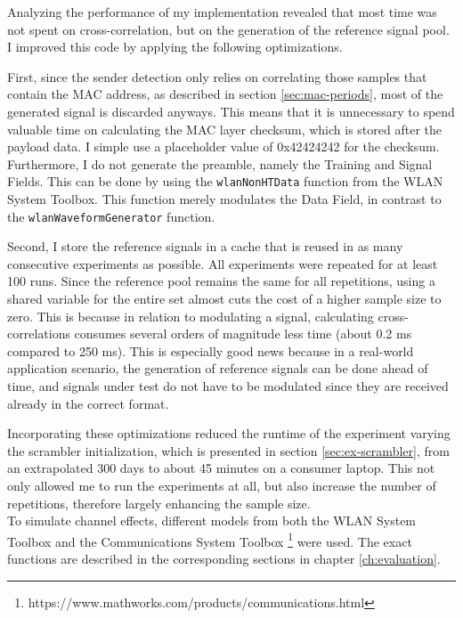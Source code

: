 Analyzing the performance of my implementation revealed that most time was not spent on cross-correlation, but on the generation of the reference signal pool. I improved this code by applying the following optimizations.

First, since the sender detection only relies on correlating those samples that contain the \gls{MAC} address, as described in section \ref{sec:mac-periods}, most of the generated signal is discarded anyways. This means that it is unnecessary to spend valuable time on calculating the \gls{MAC} layer checksum, which is stored after the payload data. I simple use a placeholder value of 0x42424242 for the checksum. Furthermore, I do not generate the preamble, namely the Training and Signal Fields. This can be done by using the \texttt{wlanNonHTData} function from the WLAN System Toolbox. This function merely modulates the Data Field, in contrast to the \texttt{wlanWaveformGenerator} function.

Second, I store the reference signals in a cache that is reused in as many consecutive experiments as possible. All experiments were repeated for at least 100 runs. Since the reference pool remains the same for all repetitions, using a shared variable for the entire set almost cuts the cost of a higher sample size to zero. This is because in relation to modulating a signal, calculating cross-correlations consumes several orders of magnitude less time (about 0.2 ms compared to 250 ms). This is especially good news because in a real-world application scenario, the generation of reference signals can be done ahead of time, and signals under test do not have to be modulated since they are received already in the correct format.

Incorporating these optimizations reduced the runtime of the experiment varying the scrambler initialization, which is presented in section \ref{sec:ex-scrambler}, from an extrapolated 300 days to about 45 minutes on a consumer laptop. This not only allowed me to run the experiments at all, but also increase the number of repetitions, therefore largely enhancing the sample size.\\

To simulate channel effects, different models from both the WLAN System Toolbox and the Communications System Toolbox \footnote{https://www.mathworks.com/products/communications.html} were used. The exact functions are described in the corresponding sections in chapter \ref{ch:evaluation}.\\

